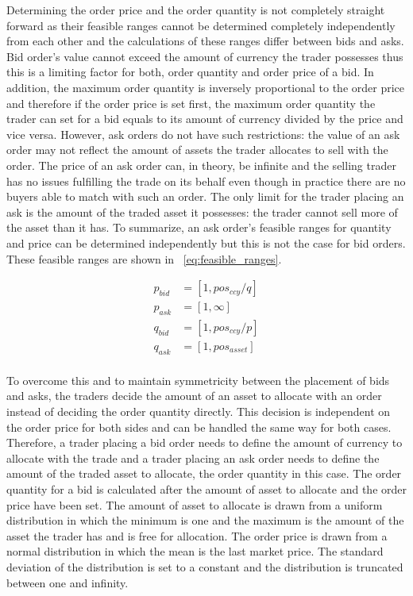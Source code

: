 Determining the order price and the order quantity is not completely straight
forward as their feasible ranges cannot be determined completely independently
from each other and the calculations of these ranges differ between bids and asks. Bid order's
value cannot exceed the amount of currency the trader possesses thus this is 
a limiting factor for both, order quantity and order price of a bid. In addition,
the maximum order quantity is inversely proportional to the order price and
therefore if the order price is set first, the maximum order quantity the trader
can set for a bid equals to its amount of currency divided by the price and vice versa. 
However, ask orders do not have such restrictions: the value of an ask order
may not reflect the amount of assets the trader allocates to sell with the order. The
price of an ask order can, in theory, be infinite and the selling trader has no issues
fulfilling the trade on its behalf even though in practice there are no buyers
able to match with such an order. The only limit for the trader placing an ask is the 
amount of the traded asset it possesses: the trader cannot sell more of the asset 
than it has. To summarize, an ask order's feasible ranges for quantity and price 
can be determined independently but this is not the case for bid orders. These feasible 
ranges are shown in ~\ref{eq:feasible_ranges}.

\begin{equation}
\begin{aligned}
p_{bid} &= \left[1, pos_{ccy} / q \right] \\
p_{ask} &= \left[1, \infty \right] \\
q_{bid} &= \left[1, pos_{ccy} / p\right] \\
q_{ask} &= \left[1, pos_{asset}\right] \\
\end{aligned}
\label{eq:feasible_ranges}
\end{equation}

To overcome this and to maintain symmetricity between the placement of bids and asks, 
the traders decide the amount of an asset to allocate with an order instead of deciding 
the order quantity directly. This decision is independent on the order price for both
sides and can be handled the same way for both cases. Therefore, a trader placing a bid order 
needs to define the amount of currency to allocate with the trade and a trader placing an ask
order needs to define the amount of the traded asset to allocate, the order quantity in this case. 
The order quantity for a bid is calculated after the amount of asset to allocate 
and the order price have been set. The amount of asset to allocate is drawn from a uniform
distribution in which the minimum is one and the maximum is the amount of the asset the trader
has and is free for allocation. The order price is drawn from a normal distribution in which 
the mean is the last market price. The standard deviation of the distribution is set to a 
constant and the distribution is truncated between one and infinity.

